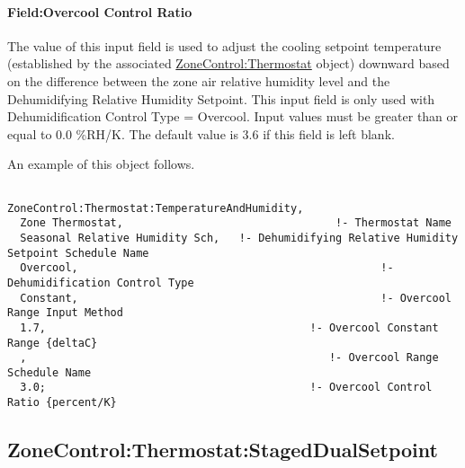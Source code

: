 \paragraph{Field:Overcool Control Ratio}\label{fieldovercool-control-ratio}

The value of this input field is used to adjust the cooling setpoint temperature (established by the associated \hyperref[zonecontrolthermostat]{ZoneControl:Thermostat} object) downward based on the difference between the zone air relative humidity level and the Dehumidifying Relative Humidity Setpoint. This input field is only used with Dehumidification Control Type = Overcool. Input values must be greater than or equal to 0.0 \%RH/K. The default value is 3.6 if this field is left blank.

An example of this object follows.

\begin{lstlisting}

ZoneControl:Thermostat:TemperatureAndHumidity,
  Zone Thermostat,                                 !- Thermostat Name
  Seasonal Relative Humidity Sch,   !- Dehumidifying Relative Humidity Setpoint Schedule Name
  Overcool,                                               !- Dehumidification Control Type
  Constant,                                               !- Overcool Range Input Method
  1.7,                                         !- Overcool Constant Range {deltaC}
  ,                                               !- Overcool Range Schedule Name
  3.0;                                         !- Overcool Control Ratio {percent/K}
\end{lstlisting}

\subsection{ZoneControl:Thermostat:StagedDualSetpoint}\label{zonecontrolthermostatstageddualsetpoint}

